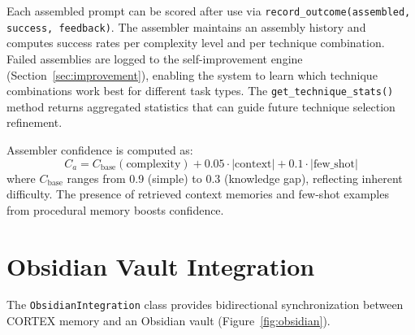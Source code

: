 \documentclass[runningheads]{llncs}
\begin{document}
Each assembled prompt can be scored after use via \texttt{record\_outcome(assembled, success, feedback)}. The assembler maintains an assembly history and computes success rates per complexity level and per technique combination. Failed assemblies are logged to the self-improvement engine (Section~\ref{sec:improvement}), enabling the system to learn which technique combinations work best for different task types. The \texttt{get\_technique\_stats()} method returns aggregated statistics that can guide future technique selection refinement.

Assembler confidence is computed as:
\begin{equation}\label{eq:assembler-confidence}
    C_a = C_{\text{base}}(\text{complexity}) + 0.05 \cdot |\text{context}| + 0.1 \cdot |\text{few\_shot}|
\end{equation}
where $C_{\text{base}}$ ranges from 0.9 (simple) to 0.3 (knowledge gap), reflecting inherent difficulty. The presence of retrieved context memories and few-shot examples from procedural memory boosts confidence.

\section{Obsidian Vault Integration}\label{sec:obsidian}

The \texttt{ObsidianIntegration} class provides bidirectional synchronization between CORTEX memory and an Obsidian vault (Figure~\ref{fig:obsidian}).
\end{document}
